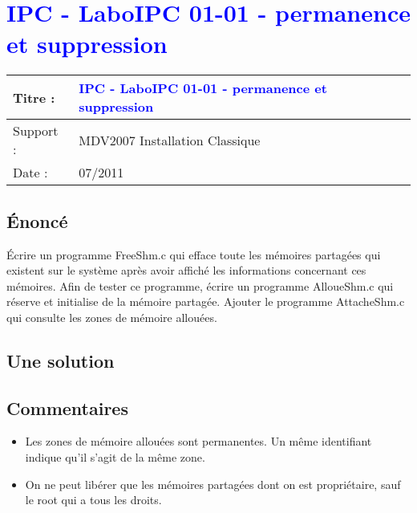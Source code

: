 
\renewcommand{\titre}{\textcolor{blue}{IPC - LaboIPC 01-01 - permanence et suppression}}

\lhead{ \titre }
\section{{\titre} }

\begin{tabular}{|l|l|}
\hline
Titre : 	& \titre \\\hline
Support : 	& MDV2007 Installation Classique \\\hline
Date :		& 07/2011 \\\hline
\end{tabular}

\subsection{Énoncé}

Écrire un programme FreeShm.c qui efface toute les mémoires partagées qui existent sur le système après avoir affiché les informations concernant ces mémoires.
Afin de tester ce programme, écrire un programme AlloueShm.c qui réserve et initialise de la mémoire partagée. Ajouter le programme AttacheShm.c qui consulte les zones de mémoire allouées.

\subsection{Une solution}





\subsection{Commentaires}

\begin{itemize}
\item Les zones de mémoire allouées sont permanentes. Un même identifiant indique qu'il s'agit de la même zone.
\item On ne peut libérer que les mémoires partagées dont on est propriétaire, sauf le root qui a tous les droits.
\end{itemize}

